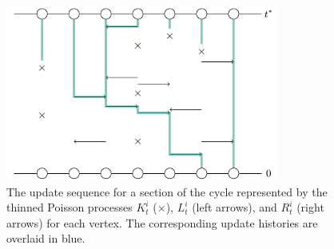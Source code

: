 	\begin{figure}
		\centering
		\includegraphics[width = 0.8\textwidth]{Figures/IsingCouplingTime/example_histories_1D_thinned_poisson.pdf}
		\caption[The update sequence for a section of the cycle and the corresponding update history from each vertex using the new update rules.]{The update sequence for a section of the cycle represented by the thinned Poisson processes $K_t^i$ ($\times$), $L_t^i$ (left arrows), and $R_t^i$ (right arrows) for each vertex. The corresponding update histories are overlaid in blue.}
		\label{fig:example histories 1D thinned poisson}
	\end{figure}


